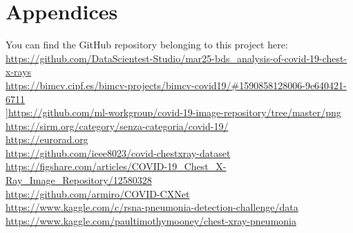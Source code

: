 \documentclass{article}
\begin{document}
\section{Appendices}

You can find the GitHub repository belonging to this project here: 
\url{https://github.com/DataScientest-Studio/mar25-bds_analysis-of-covid-19-chest-x-rays}\\
\url{https://bimcv.cipf.es/bimcv-projects/bimcv-covid19/#1590858128006-9e640421-6711}\\
]\url{https://github.com/ml-workgroup/covid-19-image-repository/tree/master/png}\\
\url{https://sirm.org/category/senza-categoria/covid-19/}\\
\url{https://eurorad.org}\\
\url{https://github.com/ieee8023/covid-chestxray-dataset}\\
\url{https://figshare.com/articles/COVID-19_Chest_X-Ray_Image_Repository/12580328}\\
\url{https://github.com/armiro/COVID-CXNet}\\  
\url{https://www.kaggle.com/c/rsna-pneumonia-detection-challenge/data}\\
\url{https://www.kaggle.com/paultimothymooney/chest-xray-pneumonia}\\
\end{document}
